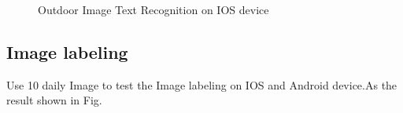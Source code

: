 \documentclass[11pt]{ucscthesis}
\begin{document}
\begin{figure}
  \hfill
\caption{Outdoor Image Text Recognition on IOS device}
\end{figure}


\subsection{Image labeling}
 Use 10 daily Image to test the Image labeling on IOS and Android device.As the result shown in Fig.
\end{document}
